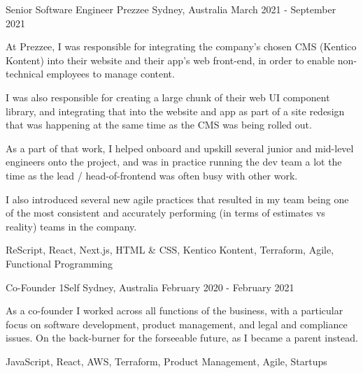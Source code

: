 \begin{cventries}
\cventry
{Senior Software Engineer} %
{Prezzee} %
{Sydney, Australia} %
{March 2021 - September 2021} %
{ %
\begin{cvitems}
\item {At Prezzee, I was responsible for integrating the company's chosen CMS (Kentico Kontent) into their website and their app's web front-end, in order to enable non-technical employees to manage content.}
\item {I was also responsible for creating a large chunk of their web UI component library, and integrating that into the website and app as part of a site redesign that was happening at the same time as the CMS was being rolled out.}
\item {As a part of that work, I helped onboard and upskill several junior and mid-level engineers onto the project, and was in practice running the dev team a lot the time as the lead / head-of-frontend was often busy with other work.}
\item {I also introduced several new agile practices that resulted in my team being one of the most consistent and accurately performing (in terms of estimates vs reality) teams in the company.}
\end{cvitems}
}
{ ReScript, React, Next.js, HTML \& CSS, Kentico Kontent, Terraform, Agile, Functional Programming }



\cventry
{Co-Founder} %
{1Self} %
{Sydney, Australia} %
{February 2020 - February 2021} %
{ %
\begin{cvitems}
\item {As a co-founder I worked across all functions of the business, with a particular focus on software development, product management, and legal and compliance issues. On the back-burner for the forseeable future, as I became a parent instead.}
\end{cvitems}
}
{ JavaScript, React, AWS, Terraform, Product Management, Agile, Startups }




\end{cventries}
